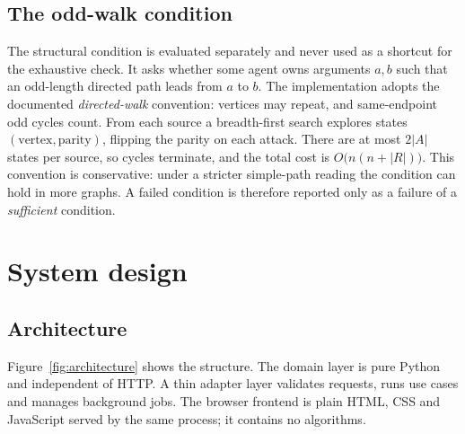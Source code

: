 \documentclass[11pt,a4paper]{article}
\begin{document}
\subsection{The odd-walk condition}
The structural condition is evaluated separately and never used as a shortcut for the exhaustive check. It asks whether some agent owns arguments $a,b$ such that an odd-length directed path leads from $a$ to $b$. The implementation adopts the documented \emph{directed-walk} convention: vertices may repeat, and same-endpoint odd cycles count. From each source a breadth-first search explores states $(\text{vertex},\text{parity})$, flipping the parity on each attack. There are at most $2|A|$ states per source, so cycles terminate, and the total cost is $O\bigl(n(n+|R|)\bigr)$. This convention is conservative: under a stricter simple-path reading the condition can hold in more graphs. A failed condition is therefore reported only as a failure of a \emph{sufficient} condition.

\section{System design}
\subsection{Architecture}
Figure~\ref{fig:architecture} shows the structure. The domain layer is pure Python and independent of HTTP. A thin adapter layer validates requests, runs use cases and manages background jobs. The browser frontend is plain HTML, CSS and JavaScript served by the same process; it contains no algorithms.
\end{document}
